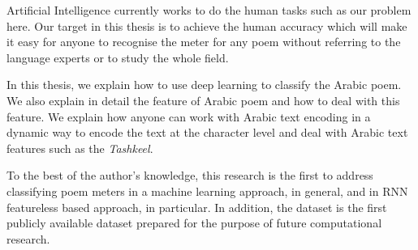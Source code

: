 Artificial Intelligence currently works to do the human tasks such as our problem here. Our target in this thesis is to achieve the human accuracy which will make it easy for anyone to recognise the meter for any poem without referring to the language experts or to study the whole field.

In this thesis, we explain how to use deep learning to classify the Arabic poem. We also explain in detail the feature of Arabic poem and how to deal with this feature. We explain how anyone can work with Arabic text encoding in a dynamic way to encode the text at the character level and deal with Arabic text features such as the \textit{Tashkeel}.

To the best of the author’s knowledge, this research is the first to address classifying poem meters in a machine learning approach, in general, and in RNN featureless based approach, in particular. In addition, the dataset is the first publicly available dataset prepared for the purpose of future computational research.






